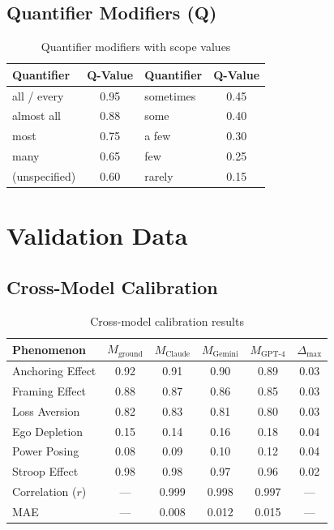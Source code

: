 \subsection{Quantifier Modifiers (Q)}

\begin{table}[H]
\centering
\small
\begin{tabular}{lc|lc}
\toprule
\textbf{Quantifier} & \textbf{Q-Value} & \textbf{Quantifier} & \textbf{Q-Value} \\
\midrule
all / every & 0.95 & sometimes & 0.45 \\
almost all & 0.88 & some & 0.40 \\
most & 0.75 & a few & 0.30 \\
many & 0.65 & few & 0.25 \\
(unspecified) & 0.60 & rarely & 0.15 \\
\bottomrule
\end{tabular}
\caption{Quantifier modifiers with scope values}
\end{table}


\section{Validation Data}
\label{app:validation}

\subsection{Cross-Model Calibration}

\begin{table}[H]
\centering
\small
\begin{tabular}{lccccc}
\toprule
\textbf{Phenomenon} & $M_{\text{ground}}$ & $M_{\text{Claude}}$ & $M_{\text{Gemini}}$ & $M_{\text{GPT-4}}$ & $\Delta_{\text{max}}$ \\
\midrule
Anchoring Effect & 0.92 & 0.91 & 0.90 & 0.89 & 0.03 \\
Framing Effect & 0.88 & 0.87 & 0.86 & 0.85 & 0.03 \\
Loss Aversion & 0.82 & 0.83 & 0.81 & 0.80 & 0.03 \\
Ego Depletion & 0.15 & 0.14 & 0.16 & 0.18 & 0.04 \\
Power Posing & 0.08 & 0.09 & 0.10 & 0.12 & 0.04 \\
Stroop Effect & 0.98 & 0.98 & 0.97 & 0.96 & 0.02 \\
\midrule
Correlation ($r$) & --- & 0.999 & 0.998 & 0.997 & --- \\
MAE & --- & 0.008 & 0.012 & 0.015 & --- \\
\bottomrule
\end{tabular}
\caption{Cross-model calibration results}
\end{table}


